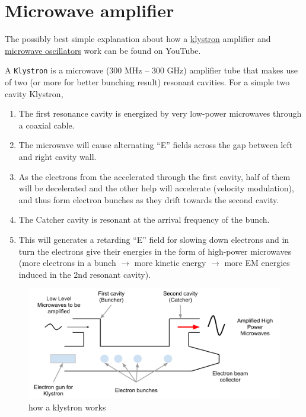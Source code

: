 \documentclass[]{book}
\providecommand{\tightlist}{%
  \setlength{\itemsep}{0pt}\setlength{\parskip}{0pt}}
\theoremstyle{definition}
\theoremstyle{definition}
\theoremstyle{definition}
\theoremstyle{remark}
\begin{document}
\section{Microwave amplifier}\label{microwave-amplifier}

The possibly best simple explanation about how a
\href{https://www.youtube.com/watch?v=Fvud81pYGOg}{klystron} amplifier
and \href{https://www.youtube.com/watch?v=VkpEQZEGSkE\&t=108s}{microwave
oscillators} work can be found on YouTube.

A \texttt{Klystron} is a microwave (300 MHz -- 300 GHz) amplifier tube
that makes use of two (or more for better bunching result) resonant
cavities. For a simple two cavity Klystron,

\begin{enumerate}
\def\labelenumi{\arabic{enumi}.}
\tightlist
\item
  The first resonance cavity is energized by very low-power microwaves
  through a coaxial cable.
\item
  The microwave will cause alternating ``E'' fields across the gap
  between left and right cavity wall.
\item
  As the electrons from the accelerated through the first cavity, half
  of them will be decelerated and the other help will accelerate
  (velocity modulation), and thus form electron bunches as they drift
  towards the second cavity.
\item
  The Catcher cavity is resonant at the arrival frequency of the bunch.
\item
  This will generates a retarding ``E'' field for slowing down electrons
  and in turn the electrons give their energies in the form of
  high-power microwaves (more electrons in a bunch \(\rightarrow\) more
  kinetic energy \(\rightarrow\) more EM energies induced in the 2nd
  resonant cavity).
\end{enumerate}

\begin{figure}

{\centering \includegraphics[width=7.07in]{figures/klystron} 

}

\caption{how a klystron works}\label{fig:unnamed-chunk-6}
\end{figure}
\end{document}
